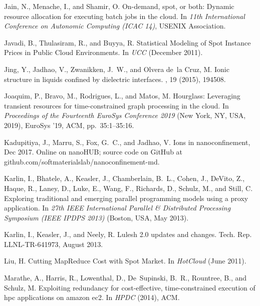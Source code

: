 \documentclass[sigconf]{acmart} %
\begin{document}
\begin{thebibliography}{10}
{\sc Jain, N., Menache, I., and Shamir, O.}
\newblock On-demand, spot, or both: Dynamic resource allocation for executing
  batch jobs in the cloud.
\newblock In {\em 11th International Conference on Autonomic Computing (ICAC
  14)}, USENIX Association.

{\sc Javadi, B., Thulasiram, R., and Buyya, R.}
\newblock Statistical {M}odeling of {S}pot {I}nstance {P}rices in {P}ublic
  {C}loud {E}nvironments.
\newblock In {\em UCC\/} (December 2011).

{\sc Jing, Y., Jadhao, V., Zwanikken, J.~W., and Olvera de~la Cruz, M.}
\newblock Ionic structure in liquids confined by dielectric interfaces.
, 19 (2015), 194508.

{\sc Joaquim, P., Bravo, M., Rodrigues, L., and Matos, M.}
\newblock Hourglass: Leveraging transient resources for time-constrained graph
  processing in the cloud.
\newblock In {\em Proceedings of the Fourteenth EuroSys Conference 2019\/} (New
  York, NY, USA, 2019), EuroSys '19, ACM, pp.~35:1--35:16.

{\sc Kadupitiya, J., Marru, S., Fox, G.~C., and Jadhao, V.}
\newblock Ions in nanoconfinement, Dec 2017.
\newblock Online on nanoHUB; source code on GitHub at
  github.com/softmaterialslab/nanoconfinement-md.

{\sc Karlin, I., Bhatele, A., Keasler, J., Chamberlain, B.~L., Cohen, J.,
  DeVito, Z., Haque, R., Laney, D., Luke, E., Wang, F., Richards, D., Schulz,
  M., and Still, C.}
\newblock Exploring traditional and emerging parallel programming models using
  a proxy application.
\newblock In {\em 27th IEEE International Parallel \& Distributed Processing
  Symposium (IEEE IPDPS 2013)\/} (Boston, USA, May 2013).

{\sc Karlin, I., Keasler, J., and Neely, R.}
\newblock Lulesh 2.0 updates and changes.
\newblock Tech. Rep. LLNL-TR-641973, August 2013.

{\sc Liu, H.}
\newblock Cutting {M}ap{R}educe {C}ost with {S}pot {M}arket.
\newblock In {\em HotCloud\/} (June 2011).

{\sc Marathe, A., Harris, R., Lowenthal, D., De~Supinski, B.~R., Rountree, B.,
  and Schulz, M.}
\newblock Exploiting redundancy for cost-effective, time-constrained execution
  of hpc applications on amazon ec2.
\newblock In {\em HPDC\/} (2014), ACM.


\end{thebibliography}
\end{document}
